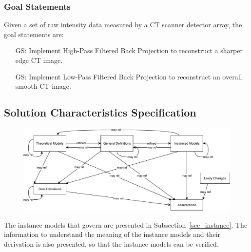 \documentclass[12pt]{article}
\newcounter{goalnum} %
\begin{document}


\subsubsection{Goal Statements}
\noindent Given a set of raw intensity data measured by a CT scanner detector array, the goal statements are:

\begin{itemize}

\item[GS\refstepcounter{goalnum}\thegoalnum \label{G1}:] Implement High-Pass
  Filtered Back Projection to reconstruct a sharper edge CT image.

\item[GS\refstepcounter{goalnum}\thegoalnum \label{G2}:] Implement Low-Pass
  Filtered Back Projection to reconstruct an overall smooth CT image.
\end{itemize}

\subsection{Solution Characteristics Specification}
\begin{figure}[H]
  \includegraphics[scale=0.9]{RelationsBetweenTM_GD_IM_DD_A.pdf}
\end{figure}

The instance models that govern \progname{} are presented in
Subsection~\ref{sec_instance}.  The information to understand the meaning of the
instance models and their derivation is also presented, so that the instance
models can be verified.
\end{document}
